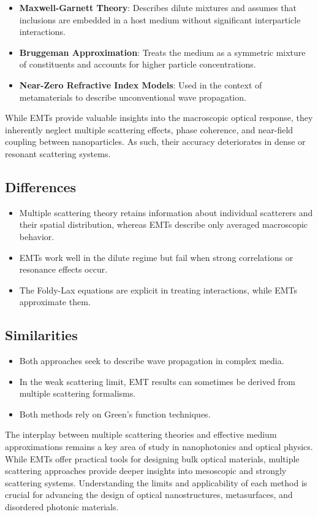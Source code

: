 \documentclass{article}
\begin{document}
 	\begin{itemize}
 		\item \textbf{Maxwell-Garnett Theory}: Describes dilute mixtures and assumes that inclusions are embedded in a host medium without significant interparticle interactions.
 		\item \textbf{Bruggeman Approximation}: Treats the medium as a symmetric mixture of constituents and accounts for higher particle concentrations.
 		\item \textbf{Near-Zero Refractive Index Models}: Used in the context of metamaterials to describe unconventional wave propagation.
 \end{itemize}
 
 
 While EMTs provide valuable insights into the macroscopic optical response, they inherently neglect multiple scattering effects, phase coherence, and near-field coupling between nanoparticles. As such, their accuracy deteriorates in dense or resonant scattering systems.

\subsection{Differences}
\begin{itemize}
    \item Multiple scattering theory retains information about individual scatterers and their spatial distribution, whereas EMTs describe only averaged macroscopic behavior.
    \item EMTs work well in the dilute regime but fail when strong correlations or resonance effects occur.
    \item The Foldy-Lax equations are explicit in treating interactions, while EMTs approximate them.
\end{itemize}

\subsection{Similarities}
\begin{itemize}
    \item Both approaches seek to describe wave propagation in complex media.
    \item In the weak scattering limit, EMT results can sometimes be derived from multiple scattering formalisms.
    \item Both methods rely on Green’s function techniques.
\end{itemize}

The interplay between multiple scattering theories and effective medium approximations remains a key area of study in nanophotonics and optical physics. While EMTs offer practical tools for designing bulk optical materials, multiple scattering approaches provide deeper insights into mesoscopic and strongly scattering systems. Understanding the limits and applicability of each method is crucial for advancing the design of optical nanostructures, metasurfaces, and disordered photonic materials.
\end{document}
